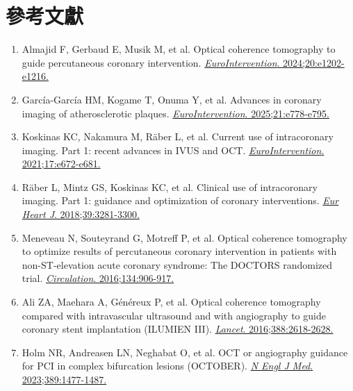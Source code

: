 \documentclass[12pt,a4paper]{article}
\begin{document}
\section{參考文獻}

\begin{enumerate}
    \item Almajid F, Gerbaud E, Musik M, et al. Optical coherence tomography to guide percutaneous coronary intervention. \href{https://doi.org/10.4244/EIJ-D-23-00912}{\textit{EuroIntervention}. 2024;20:e1202-e1216.}

    \item García-García HM, Kogame T, Onuma Y, et al. Advances in coronary imaging of atherosclerotic plaques. \href{https://doi.org/10.4244/EIJ-D-24-00387}{\textit{EuroIntervention}. 2025;21:e778-e795.}

    \item Koskinas KC, Nakamura M, Räber L, et al. Current use of intracoronary imaging. Part 1: recent advances in IVUS and OCT. \href{https://doi.org/10.4244/EIJ-D-21-00225}{\textit{EuroIntervention}. 2021;17:e672-e681.}

    \item Räber L, Mintz GS, Koskinas KC, et al. Clinical use of intracoronary imaging. Part 1: guidance and optimization of coronary interventions. \href{https://doi.org/10.1093/eurheartj/ehy285}{\textit{Eur Heart J}. 2018;39:3281-3300.}

    \item Meneveau N, Souteyrand G, Motreff P, et al. Optical coherence tomography to optimize results of percutaneous coronary intervention in patients with non-ST-elevation acute coronary syndrome: The DOCTORS randomized trial. \href{https://doi.org/10.1161/CIRCULATIONAHA.116.024393}{\textit{Circulation}. 2016;134:906-917.}

    \item Ali ZA, Maehara A, Généreux P, et al. Optical coherence tomography compared with intravascular ultrasound and with angiography to guide coronary stent implantation (ILUMIEN III). \href{https://doi.org/10.1016/S0140-6736(16)31922-5}{\textit{Lancet}. 2016;388:2618-2628.}

    \item Holm NR, Andreasen LN, Neghabat O, et al. OCT or angiography guidance for PCI in complex bifurcation lesions (OCTOBER). \href{https://doi.org/10.1056/NEJMoa2307770}{\textit{N Engl J Med}. 2023;389:1477-1487.}


\end{enumerate}
\end{document}
